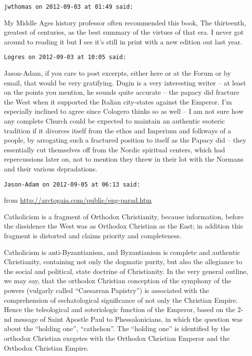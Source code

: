 \begin{footnotesize}
\begin{sffamily}
\hfill

\texttt{jwthomas on 2012-09-03 at 01:49 said:}

My Middle Ages history professor often recommended this book, The thirteenth, greatest of centuries, as the best summary of the virtues of that era. I never got around to reading it but I see it's still in print with a new edition out last year.


\hfill

\texttt{Logres on 2012-09-03 at 10:05 said:}

Jason-Adam, if you care to post excerpts, either here or at the Forum or by email, that would be very gratifying. Dugin is a very interesting writer – at least on the points you mention, he sounds quite accurate – the papacy did fracture the West when it supported the Italian city-states against the Emperor. I'm especially inclined to agree since Cologero thinks so as well – I am not sure how any complete Church could be expected to maintain an authentic esoteric tradition if it divorces itself from the ethos and Imperium and folkways of a people, by arrogating such a fractured position to itself as the Papacy did – they essentially cut themselves off from the Nordic spiritual centers, which had repercussions later on, not to mention they threw in their lot with the Normans and their various depradations.


\hfill

\texttt{Jason-Adam on 2012-09-05 at 06:13 said:}

from \url{http://arctogaia.com/public/eng-parad.htm}

Catholicism is a fragment of Orthodox Christianity, because information, before the dissidence the West was as Orthodox Christian as the East; in addition this fragment is distorted and claims priority and completeness.

Catholicism is anti-Byzantianism, and Byzantianism is complete and authentic Christianity, containing not only the dogmatic purity, but also the allegiance to the social and political, state doctrine of Christianity. In the very general outline, we may say, that the orthodox Christian conception of the symphony of the powers (vulgarly called “Caesarean Papistry”) is associated with the comprehension of eschatological significance of not only the Christian Empire. Hence the teleological and soteriologic function of the Emperor, based on the 2-nd message of Saint Apostle Paul to Phessalonicians, in which the question was about the “holding one”, “cathehon”. The “holding one” is identified by the orthodox Christian exegetes with the Orthodox Christian Emperor and the Orthodox Christian Empire.


\end{sffamily}
\end{footnotesize}
